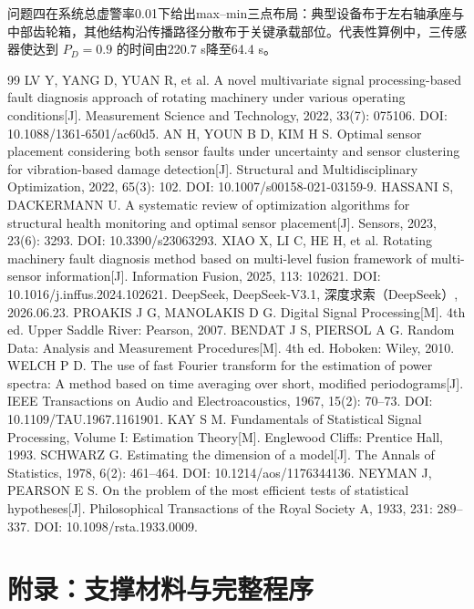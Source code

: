 \documentclass[withoutpreface,bwprint]{cumcmthesis}
\begin{document}
问题四在系统总虚警率0.01下给出max--min三点布局：典型设备布于左右轴承座与中部齿轮箱，其他结构沿传播路径分散布于关键承载部位。代表性算例中，三传感器使达到 \(P_D=0.9\) 的时间由220.7 s降至64.4 s。

\begin{thebibliography}{99}
 LV Y, YANG D, YUAN R, et al. A novel multivariate signal processing-based fault diagnosis approach of rotating machinery under various operating conditions[J]. Measurement Science and Technology, 2022, 33(7): 075106. DOI: 10.1088/1361-6501/ac60d5.
 AN H, YOUN B D, KIM H S. Optimal sensor placement considering both sensor faults under uncertainty and sensor clustering for vibration-based damage detection[J]. Structural and Multidisciplinary Optimization, 2022, 65(3): 102. DOI: 10.1007/s00158-021-03159-9.
 HASSANI S, DACKERMANN U. A systematic review of optimization algorithms for structural health monitoring and optimal sensor placement[J]. Sensors, 2023, 23(6): 3293. DOI: 10.3390/s23063293.
 XIAO X, LI C, HE H, et al. Rotating machinery fault diagnosis method based on multi-level fusion framework of multi-sensor information[J]. Information Fusion, 2025, 113: 102621. DOI: 10.1016/j.inffus.2024.102621.
 DeepSeek, DeepSeek-V3.1, 深度求索（DeepSeek）, 2026.06.23.
 PROAKIS J G, MANOLAKIS D G. Digital Signal Processing[M]. 4th ed. Upper Saddle River: Pearson, 2007.
 BENDAT J S, PIERSOL A G. Random Data: Analysis and Measurement Procedures[M]. 4th ed. Hoboken: Wiley, 2010.
 WELCH P D. The use of fast Fourier transform for the estimation of power spectra: A method based on time averaging over short, modified periodograms[J]. IEEE Transactions on Audio and Electroacoustics, 1967, 15(2): 70--73. DOI: 10.1109/TAU.1967.1161901.
 KAY S M. Fundamentals of Statistical Signal Processing, Volume I: Estimation Theory[M]. Englewood Cliffs: Prentice Hall, 1993.
 SCHWARZ G. Estimating the dimension of a model[J]. The Annals of Statistics, 1978, 6(2): 461--464. DOI: 10.1214/aos/1176344136.
 NEYMAN J, PEARSON E S. On the problem of the most efficient tests of statistical hypotheses[J]. Philosophical Transactions of the Royal Society A, 1933, 231: 289--337. DOI: 10.1098/rsta.1933.0009.
\end{thebibliography}

\newpage

\section*{附录：支撑材料与完整程序}
\end{document}
